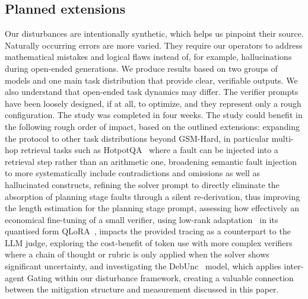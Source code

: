 \documentclass[11pt]{article}
\begin{document}
\subsection*{Planned extensions}
Our disturbances are intentionally synthetic, which helps us pinpoint their source.
Naturally occurring errors are more varied. They require our operators to address mathematical 
mistakes and logical flaws instead of, for example, hallucinations during open-ended generations. 
We produce results based on two groups of models and one main task distribution that provide 
clear, verifiable outputs. We also understand that open-ended task dynamics may differ. The 
verifier prompts have been loosely designed, if at all, to optimize, and they represent only 
a rough configuration. The study was completed in four weeks. 
\newline The study could benefit in the following rough order of impact, based on the outlined 
extensions: expanding the protocol to other task distributions beyond GSM-Hard, in particular
multi-hop retrieval tasks such as HotpotQA~\citep{yang2018hotpotqa} where a fault can be
injected into a retrieval step rather than an arithmetic one, broadening
semantic fault injection to more systematically include contradictions and omissions as well
as hallucinated constructs, refining the solver prompt to directly eliminate the absorption
of planning stage faults through a silent re-derivation, thus improving the length estimation
for the planning stage prompt, assessing how effectively an economical fine-tuning of a small
verifier, using low-rank adaptation~\citep{hu2021lora} in its quantised form
QLoRA~\citep{dettmers2023qlora}, impacts the provided tracing as a counterpart
to the LLM judge, exploring the cost-benefit of token use with more complex verifiers where 
a chain of thought or rubric is only applied when the solver shows significant uncertainty, and 
investigating the DebUnc~\citep{yoffe2024debunc} model, which applies inter-agent Gating within 
our disturbance framework, creating a valuable connection between the mitigation structure and 
measurement discussed in this paper.
\end{document}
